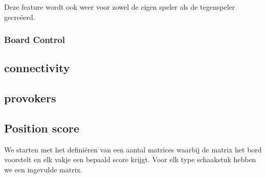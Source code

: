 \documentclass[a4paper,openany]{uantwerpenassignment}
\begin{document}
Deze feature wordt ook weer voor zowel de eigen speler als de tegenspeler gecreëerd.

\subsubsection{Board Control}

\subsection{connectivity}
\subsection{provokers}
\subsection{Position score}
We starten met het definiëren van een aantal matrices waarbij de matrix het bord voorstelt en elk vakje een bepaald score krijgt. Voor elk type schaakstuk hebben we een ingevulde matrix.
\end{document}

